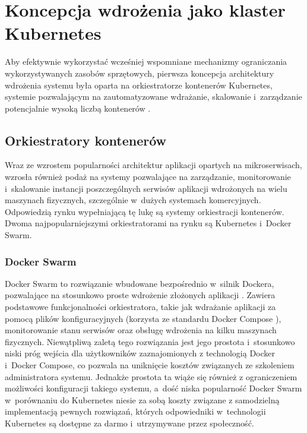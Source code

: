 \section{Koncepcja wdrożenia jako klaster Kubernetes}
Aby efektywnie wykorzystać wcześniej wspomniane mechanizmy ograniczania wykorzystywanych zasobów sprzętowych, pierwsza koncepcja architektury wdrożenia systemu była oparta na orkiestratorze kontenerów Kubernetes, systemie pozwalającym na zautomatyzowane wdrażanie, skalowanie i~zarządzanie potencjalnie wysoką liczbą kontenerów \cite{k8sMain}.

\subsection{Orkiestratory kontenerów}
Wraz ze wzrostem popularności architektur aplikacji opartych na mikroserwisach, wzrosła również podaż na systemy pozwalające na zarządzanie, monitorowanie i~skalowanie instancji poszczególnych serwisów aplikacji wdrożonych na wielu maszynach fizycznych, szczególnie w~dużych systemach komercyjnych. Odpowiedzią rynku wypełniającą tę lukę są systemy orkiestracji kontenerów. Dwoma najpopularniejszymi orkiestratorami na rynku są Kubernetes i~Docker Swarm.

\subsubsection{Docker Swarm}
Docker Swarm to rozwiązanie wbudowane bezpośrednio w~silnik Dockera, pozwalające na stosunkowo proste wdrożenie złożonych aplikacji \cite{dockerSwarm}. Zawiera podstawowe funkcjonalności orkiestratora, takie jak wdrażanie aplikacji za pomocą plików konfiguracyjnych (korzysta ze standardu Docker Compose \cite{dockerCompose}), monitorowanie stanu serwisów oraz obsługę wdrożenia na kilku maszynach fizycznych. Niewątpliwą zaletą tego rozwiązania jest jego prostota i~stosunkowo niski próg wejścia dla użytkowników zaznajomionych z technologią Docker i~Docker Compose, co pozwala na uniknięcie kosztów związanych ze szkoleniem administratora systemu. Jednakże prostota ta wiąże się również z ograniczeniem możliwości konfiguracji takiego systemu, a~dość niska popularność Docker Swarm w~porównaniu do Kubernetes niesie za sobą koszty związane z samodzielną implementacją pewnych rozwiązań, których odpowiedniki w~technologii Kubernetes są dostępne za darmo i~utrzymywane przez społeczność.
